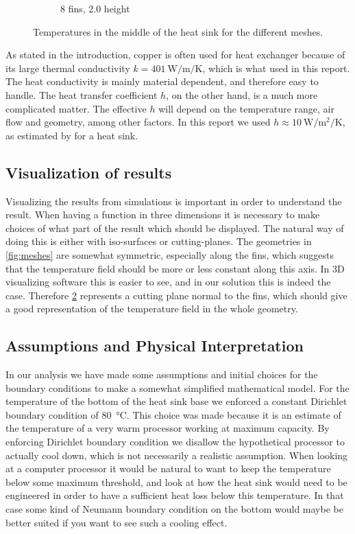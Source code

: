 \begin{figure}[h]
\begin{subfigure}[t] {0.23\textwidth}
\caption{8 fins, \num{2.0} height}
\label{fig:mesh_temps_res_8_2}
\end{subfigure}
\caption{Temperatures in the middle of the heat sink for the different meshes.}
\label{fig:mesh_temps}
\end{figure}

As stated in the introduction, copper is often used for heat exchanger because of its large thermal conductivity $k = \SI{401}{\watt\per\meter\per\kelvin}$, which is what used in this report. The heat conductivity is mainly material dependent, and therefore easy to handle. The heat transfer coefficient $h$, on the other hand, is a much more complicated matter. The effective $h$ will depend on the temperature range, air flow and geometry, among other factors. In this report we used $h \approx \SI{10}{\watt\per\meter\squared\per\kelvin}$, as estimated by \cite{heat_transfer_coeff} for a heat sink.

\subsection{Visualization of results}
Visualizing the results from simulations is important in order to understand the result. When having a function in three dimensions it is necessary to make choices of what part of the result which should be displayed. The natural way of doing this is either with iso-surfaces or cutting-planes. The geometries in \cref{fig:meshes} are somewhat symmetric, especially along the fins, which suggests that the temperature field should be more or less constant along this axis. In 3D visualizing software this is easier to see, and in our solution this is indeed the case. Therefore \cref{fig:mesh_temps} represents a cutting plane normal to the fins, which should give a good representation of the temperature field in the whole geometry.

\subsection{Assumptions and Physical Interpretation}
In our analysis we have made some assumptions and initial choices for the boundary conditions to make a somewhat simplified mathematical model. For the temperature of the bottom of the heat sink base we enforced a constant Dirichlet boundary condition of \SI{80}{\celsius}. This choice was made because it is an estimate of the temperature of a very warm processor working at maximum capacity. By enforcing Dirichlet boundary condition we disallow the hypothetical processor to actually cool down, which is not necessarily a realistic assumption. When looking at a computer processor it would be natural to want to keep the temperature below some maximum threshold, and look at how the heat sink would need to be engineered in order to have a sufficient heat loss below this temperature. In that case some kind of Neumann boundary condition on the bottom would  maybe be better suited if you want to see such a cooling effect.


